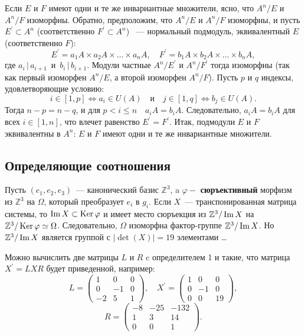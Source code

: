 \documentclass{../../template/mai_book}
\begin{document}
    Если $E$ и $F$ имеют одни и те же инвариантные множители, ясно, что $A^n/E$ и $A^n/F$ изоморфны. Обратно, предположим, что $A^n/E$ и $A^n/F$ изоморфны, и пусть $E^\prime \subset A^n$ (соответственно $F^\prime \subset A^n$) ~— нормальный подмодуль, эквивалентный $E$ (соответственно $F$):
    $$E^\prime = a_1A \times a_2A \times \ldots \times a_nA,\quad F^\prime = b_1A \times b_2A \times \ldots \times b_nA,$$
    где $a_i\,|\,a_{i+1}\,$ и $\,b_i\,|\,b_{i+1}$. Модули частные $A^n/E^\prime$ и $A^n/F^\prime$ тогда изоморфны (так как первый изоморфен $A^n/E$, а второй изоморфен $A^n/F$). Пусть $p$ и $q$ индексы, удовлетворяющие условию:
    $$i \in [1, p] \Leftrightarrow a_i \in U(A)\quad\mathrm{и}\quad j \in [1, q] \Leftrightarrow b_j \in U(A).$$
    Тогда $n-p = n-q$, и для $p < i \leqslant n\quad a_iA = b_iA$. Следовательно, $a_iA = b_iA$ для всех $i \in [1, n]$, что влечет равенство $E^\prime = F^\prime$. Итак, подмодули $E$ и $F$ эквивалентны в $A^n$: $E$ и $F$ имеют одни и те же инвариантные множители.



    \subsection{\normalsize{Определяющие соотношения}}

    Пусть $(e_1, e_2, e_3)$~— канонический базис $\mathbb{Z}^3$, a $\varphi -$ {\bf{сюръективный}} морфизм из $\mathbb{Z}^3$ на $\Omega$, который преобразует $e_i$ в $g_i$. Если $X$~— транспонированная матрица системы, то $\operatorname{Im} X \subset \operatorname{Ker}\varphi$ и имеет место сюръекция из $\mathbb{Z}^3/\operatorname{Im} X$ на $\mathbb{Z}^3/\operatorname{Ker}\varphi \simeq \Omega$. Следовательно, $\Omega$ изоморфна фактор-группе $\mathbb{Z}^3/\operatorname{Im} X$. Но $\mathbb{Z}^3/\operatorname{Im} X$ является группой с $|\det(X)| = 19$ элементами \ldots

    Можно вычислить две матрицы $L$ и $R$ c определителем 1 и такие, что матрица $X^\prime = LXR$ будет приведенной, например:
    $$ L = \begin{pmatrix}
    1 & 0 & 0\\
    0 & -1 & 0\\
    -2 & 5 & 1
    \end{pmatrix},\quad X^\prime = \begin{pmatrix}
    1 & 0 & 0\\
    0 & -1 & 0\\
    0 & 0 & 19
    \end{pmatrix},$$
    $$R = \begin{pmatrix}
    -8 & -25 & -132\\
    1 & 3 & 14\\
    0 & 0 & 1
    \end{pmatrix}.$$
\end{document}

